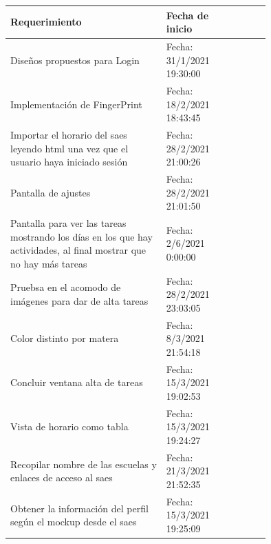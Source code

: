 \documentclass[10pt]{article}
\begin{document}
\centering
\begin{table}[H]
    \begin{tabular}{|p{0.6\linewidth}|l |p{0.15\linewidth}|}
        \hline
        \textbf{Requerimiento}                                                                                               & \textbf{Fecha de inicio}  \\ \hline
        {Diseños propuestos para Login}                                                                                      & Fecha: 31/1/2021 19:30:00 \\ \hline
        {Implementación de FingerPrint}                                                                                      & Fecha: 18/2/2021 18:43:45 \\ \hline
        {Importar el horario del saes leyendo html una vez que el usuario haya iniciado sesión}                              & Fecha: 28/2/2021 21:00:26 \\ \hline
        {Pantalla de ajustes}                                                                                                & Fecha: 28/2/2021 21:01:50 \\ \hline
        {Pantalla para ver las tareas mostrando los días en los que hay actividades, al final mostrar que no hay más tareas} & Fecha: 2/6/2021 0:00:00   \\ \hline
        {Pruebsa en el acomodo de imágenes para dar de alta tareas}                                                          & Fecha: 28/2/2021 23:03:05 \\ \hline
        {Color distinto por matera}                                                                                          & Fecha: 8/3/2021 21:54:18  \\ \hline
        {Concluir ventana alta de tareas}                                                                                    & Fecha: 15/3/2021 19:02:53 \\ \hline
        {Vista de horario como tabla}                                                                                        & Fecha: 15/3/2021 19:24:27 \\ \hline
        {Recopilar nombre de las escuelas y enlaces de acceso al saes}                                                       & Fecha: 21/3/2021 21:52:35 \\ \hline
        {Obtener la información del perfil según el mockup desde el saes}                                                    & Fecha: 15/3/2021 19:25:09 \\ \hline

\end{tabular}
\end{table}
\end{document}

